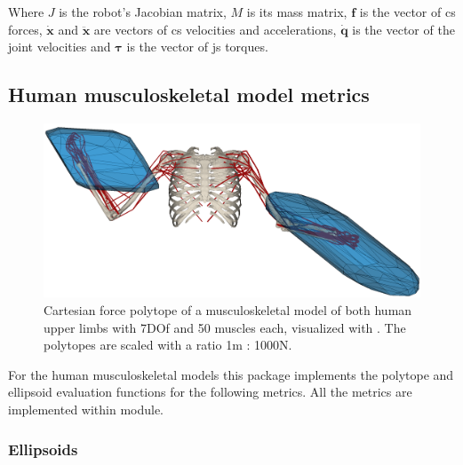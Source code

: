 Where $J$ is the robot's Jacobian matrix, $M$ is its mass matrix, $\bm{f}$ is the vector of \gls{cs} forces, $\dot{\bm{x}}$ and $\ddot{\bm{x}}$ are vectors of \gls{cs} velocities and accelerations, $\dot{\bm{q}}$ is the vector of the joint velocities and $\bm{\tau}$ is the vector of \gls{js} torques.

\subsection{Human musculoskeletal model metrics}
\label{sec:pycapacity_human}

\begin{figure}[!h]
    \centering
    \includegraphics[width=0.7\linewidth]{Papers/images/bimanual.png}
    \caption{Cartesian force polytope of a musculoskeletal model of both human upper limbs with 7DOf and 50 muscles each, visualized with . The polytopes are scaled with a ratio 1m : 1000N.}
    \label{fig:force_polytope_human_revisit}
\end{figure}

For the human musculoskeletal models this package implements the polytope and ellipsoid evaluation functions for the following metrics. All the metrics are implemented within  module.

\subsubsection*{Ellipsoids}

